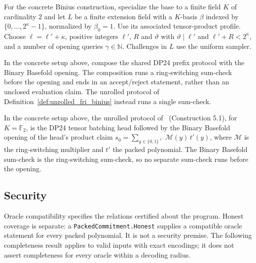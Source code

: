 For the concrete Binius construction, specialize the base to a finite field $K$ of cardinality
$2$ and let $L$ be a finite extension field with a $K$-basis $\beta$ indexed by
$\{0,\ldots,2^\kappa-1\}$, normalized by $\beta_0=1$. Use its associated tensor-product profile.
Choose $\ell=\ell'+\kappa$, positive integers $\ell'$, $R$ and $\vartheta$ with
$\vartheta\mid\ell'$ and $\ell'+R<2^\kappa$, and a number of opening queries
$\gamma\in\mathbb{N}$. Challenges in $L$ use the uniform sampler.

\begin{definition}
  \leanok
  \label{def:full_ring_switching}
  In the concrete setup above, compose the shared DP24 prefix protocol with the Binary
  Basefold opening. The composition runs a ring-switching sum-check before the opening and ends
  in an accept/reject statement, rather than an unclosed evaluation claim. The unrolled protocol
  of Definition~\ref{def:unrolled_fri_binius} instead runs a single sum-check.
\end{definition}

\begin{definition}
  \leanok
  \label{def:unrolled_fri_binius}
  In the concrete setup above, the unrolled protocol of~\cite{DP24} (Construction 5.1), for
  $K = \mathbb{F}_2$, is the DP24 tensor batching head followed by the Binary Basefold opening of
  the head's product claim $s_0 = \sum_{y \in \{0,1\}^{\ell'}} \mathcal{M}(y)\, t'(y)$, where
  $\mathcal{M}$ is the ring-switching multiplier and $t'$ the packed polynomial.
  The Binary Basefold sum-check is the ring-switching sum-check, so no separate sum-check runs
  before the opening.
\end{definition}

\subsection{Security}

Oracle compatibility specifies the relations certified about the program. Honest coverage is
separate: a \texttt{PackedCommitment.Honest} supplies a compatible oracle statement for every
packed polynomial. It is not a security premise. The following completeness result applies to
valid inputs with exact encodings; it does not assert completeness for every oracle within a
decoding radius.

